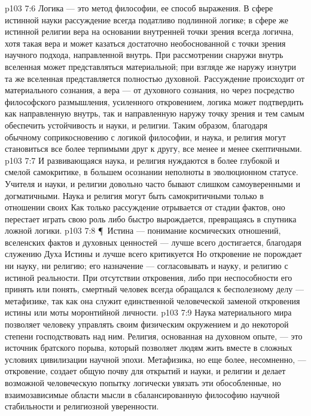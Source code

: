 \vs p103 7:6 Логика --- это метод философии, ее способ выражения. В сфере истинной науки рассуждение всегда податливо подлинной логике; в сфере же истинной религии вера на основании внутренней точки зрения всегда логична, хотя такая вера и может казаться достаточно необоснованной с точки зрения научного подхода, направленной внутрь. При рассмотрении снаружи внутрь вселенная может представляться материальной; при взгляде же наружу изнутри та же вселенная представляется полностью духовной. Рассуждение происходит от материального сознания, а вера --- от духовного сознания, но через посредство философского размышления, усиленного откровением, логика может подтвердить как направленную внутрь, так и направленную наружу точку зрения и тем самым обеспечить устойчивость и науки, и религии. Таким образом, благодаря обычному соприкосновению с логикой философии, и наука, и религия могут становиться все более терпимыми друг к другу, все менее и менее скептичными.
\vs p103 7:7 И развивающаяся наука, и религия нуждаются в более глубокой и смелой самокритике, в большем осознании неполноты в эволюционном статусе. Учителя и науки, и религии довольно часто бывают слишком самоуверенными и догматичными. Наука и религия могут быть самокритичными только в отношении своих  Как только рассуждение отрывается от стадии фактов, оно перестает играть свою роль либо быстро вырождается, превращаясь в спутника ложной логики.
\vs p103 7:8 \P\ Истина --- понимание космических отношений, вселенских фактов и духовных ценностей --- лучше всего достигается, благодаря служению Духа Истины и лучше всего критикуется  Но откровение не порождает ни науку, ни религию; его назначение --- согласовывать и науку, и религию с истиной реальности. При отсутствии откровения, либо при неспособности его принять или понять, смертный человек всегда обращался к бесполезному делу --- метафизике, так как она служит единственной человеческой заменой откровения истины или моты моронтийной личности.
\vs p103 7:9 Наука материального мира позволяет человеку управлять своим физическим окружением и до некоторой степени господствовать над ним. Религия, основанная на духовном опыте, --- это источник братского порыва, который позволяет людям жить вместе в сложных условиях цивилизации научной эпохи. Метафизика, но еще более, несомненно, --- откровение, создает общую почву для открытий и науки, и религии и делает возможной человеческую попытку логически увязать эти обособленные, но взаимозависимые области мысли в сбалансированную философию научной стабильности и религиозной уверенности.

